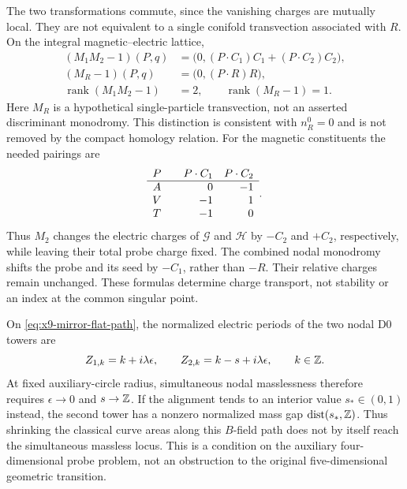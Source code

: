 The two transformations commute, since the vanishing charges are
mutually local. They are not equivalent to a single conifold
transvection associated with $R$. On the integral magnetic--electric
lattice,
\begin{equation}
 \begin{aligned}
 (M_1M_2-1)(P,q)&=
       \bigl(0,(P\cdot C_1)C_1+(P\cdot C_2)C_2\bigr),\\
 (M_R-1)(P,q)&=\bigl(0,(P\cdot R)R\bigr),\\
 \operatorname{rank}(M_1M_2-1)&=2,\qquad
 \operatorname{rank}(M_R-1)=1.
 \end{aligned}
 \label{eq:x9-two-node-monodromy}
\end{equation}
Here $M_R$ is a hypothetical single-particle transvection, not an
asserted discriminant monodromy. This distinction is consistent
with $n^0_R=0$ and is not removed by the compact homology relation.
For the magnetic constituents the needed pairings are
\begin{equation}
 \begin{array}{c@{\qquad}rr}
 P&P\cdot C_1&P\cdot C_2\\\hline
 A&0&-1\\ V&-1&1\\ T&-1&0
 \end{array}.
 \label{eq:x9-nodal-probe-pairings}
\end{equation}
Thus $M_2$ changes the electric charges of $\mathcal G$ and
$\mathcal H$ by $-C_2$ and $+C_2$, respectively, while leaving
their total probe charge fixed. The combined nodal monodromy shifts
the probe and its seed by $-C_1$, rather than $-R$. Their relative
charges remain unchanged. These formulas determine charge transport,
not stability or an index at the common singular point.

On \eqref{eq:x9-mirror-flat-path}, the normalized electric periods
of the two nodal D0 towers are
\begin{equation}
 Z_{1,k}=k+i\lambda\epsilon,\qquad
 Z_{2,k}=k-s+i\lambda\epsilon,\qquad k\in\mathbb Z.
 \label{eq:x9-nodal-tower-endpoint}
\end{equation}
At fixed auxiliary-circle radius, simultaneous nodal masslessness
therefore requires $\epsilon\to0$ and $s\to\mathbb Z$.
If the alignment tends to an interior value $s_*\in(0,1)$ instead,
the second tower has a nonzero normalized mass gap
$\operatorname{dist}(s_*,\mathbb Z)$. Thus shrinking the classical curve
areas along this $B$-field path does not by itself reach the
simultaneous massless locus. This is a condition on the auxiliary
four-dimensional probe problem, not an obstruction to the original
five-dimensional geometric transition.


